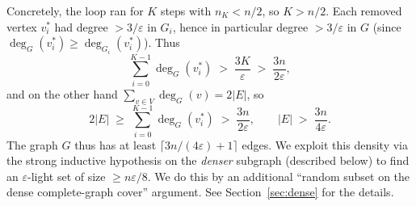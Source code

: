\documentclass[12pt]{article}
\theoremstyle{definition}
\begin{document}
Concretely, the loop ran for $K$ steps with $n_K<n/2$, so $K>n/2$.  Each removed vertex $v_i^*$ had degree $>3/\varepsilon$ in $G_i$, hence in particular degree $>3/\varepsilon$ in $G$ (since $\deg_G(v_i^*)\ge\deg_{G_i}(v_i^*)$).  Thus
\[
\sum_{i=0}^{K-1} \deg_G(v_i^*) \;>\; \frac{3K}{\varepsilon} \;>\; \frac{3n}{2\varepsilon},
\]
and on the other hand $\sum_{v\in V}\deg_G(v) = 2|E|$, so
\begin{equation}\label{eq:E-large}
2|E| \;\ge\; \sum_{i=0}^{K-1}\deg_G(v_i^*) \;>\; \frac{3n}{2\varepsilon}, \qquad |E| \;>\; \frac{3n}{4\varepsilon}.
\end{equation}
The graph $G$ thus has at least $\lceil 3n/(4\varepsilon)+1\rceil$ edges.  We exploit this density via the strong inductive hypothesis on the \emph{denser} subgraph (described below) to find an $\varepsilon$-light set of size $\ge n\varepsilon/8$.  We do this by an additional ``random subset on the dense complete-graph cover'' argument.  See Section~\ref{sec:dense} for the details.
\end{document}
